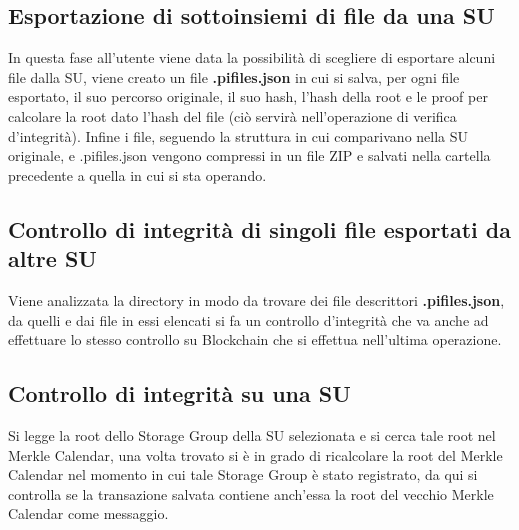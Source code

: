 \subsection{Esportazione di sottoinsiemi di file da una SU}
In questa fase all’utente viene data la possibilità di scegliere di esportare alcuni file dalla SU, viene creato un file \textbf{.pifiles.json} in cui si salva, per ogni file esportato, il suo percorso originale, il suo hash, l’hash della root e le proof per calcolare la root dato l’hash del file (ciò servirà nell’operazione di verifica d’integrità). Infine i file, seguendo la struttura in cui comparivano nella SU originale, e .pifiles.json vengono compressi in un file ZIP e salvati nella cartella precedente a quella in cui si sta operando.

\subsection{Controllo di integrità di singoli file esportati da altre SU}
Viene analizzata la directory in modo da trovare dei file descrittori \textbf{.pifiles.json}, da quelli e dai file in essi elencati si fa un controllo d’integrità che va anche ad effettuare lo stesso controllo su Blockchain che si effettua nell’ultima operazione.

\subsection{Controllo di integrità su una SU}
Si legge la root dello Storage Group della SU selezionata e si cerca tale root nel Merkle Calendar, una volta trovato si è in grado di ricalcolare la root del Merkle Calendar nel momento in cui tale Storage Group è stato registrato, da qui si controlla se la transazione salvata contiene anch’essa la root del vecchio Merkle Calendar come messaggio.
